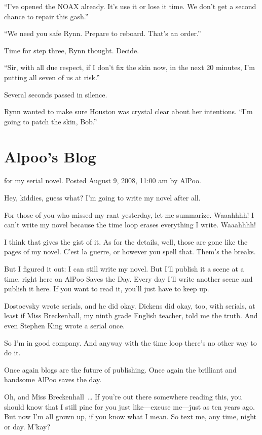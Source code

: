 “I’ve opened the NOAX already. It’s use it or lose it time. We don’t get a second chance to repair this gash.”

“We need you safe Rynn. Prepare to reboard. That’s an order.”

Time for step three, Rynn thought. Decide.

“Sir, with all due respect, if I don’t fix the skin now, in the next 20 minutes, I’m putting all seven of us at risk.”

Several seconds passed in silence.

Rynn wanted to make sure Houston was crystal clear about her intentions. “I’m going to patch the skin, Bob.”



\chapter{Alpoo’s Blog}

 for my serial novel. Posted August 9, 2008, 11:00 am by AlPoo.

Hey, kiddies, guess what? I’m going to write my novel after all.

For those of you who missed my rant yesterday, let me summarize. Waaahhhh! I can’t write my novel because the time loop erases everything I write. Waaahhhh!

I think that gives the gist of it. As for the details, well, those are gone like the pages of my novel. C’est la guerre, or however you spell that. Them’s the breaks.

But I figured it out: I can still write my novel. But I’ll publish it a scene at a time, right here on AlPoo Saves the Day. Every day I’ll write another scene and publish it here. If you want to read it, you’ll just have to keep up.

Dostoevsky wrote serials, and he did okay. Dickens did okay, too, with serials, at least if Miss Breckenhall, my ninth grade English teacher, told me the truth. And even Stephen King wrote a serial once.

So I’m in good company. And anyway with the time loop there’s no other way to do it.

Once again blogs are the future of publishing. Once again the brilliant and handsome AlPoo saves the day.

Oh, and Miss Breckenhall~… If you’re out there somewhere reading this, you should know that I still pine for you just like—excuse me—just as ten years ago. But now I’m all grown up, if you know what I mean. So text me, any time, night or day. M’kay?

